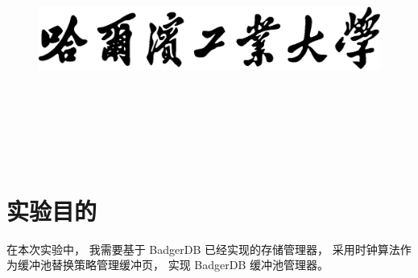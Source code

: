 \documentclass[12pt,onecolumn]{report}
\newcommand{\hei}{\CJKfamily{hei}}      %
\theoremstyle{plain}
\numberwithin{figure}{chapter}
\numberwithin{table}{chapter}
\numberwithin{lstlisting}{chapter}
\begin{document}
\begin{titlepage}
  \vspace{5\baselineskip}

  \begin{figure}[H]
    \centering
    \includegraphics[width=0.6\linewidth]{figures/school.eps}
  \end{figure}

  \centering\hei{}

  \xiaosan\vspace{\baselineskip}


  \erhao\vspace{2\baselineskip}


  \sanhao\vspace{3\baselineskip}

  ~~\underline{} \\ [24pt]
  ~~\underline{} \\ [24pt]
  ~~\underline{} \\ [24pt]
  ~~\underline{} \\ [24pt]
  ~~\underline{} \\ [24pt]
\end{titlepage}

\clearpage
\tableofcontents
\clearpage

\makeatletter
\patchcmd{\chapter}{\if@openright\cleardoublepage\else\clearpage\fi}{}{}{}
\makeatother

\chapter{实验目的}
在本次实验中，
我需要基于 BadgerDB 已经实现的存储管理器，
采用时钟算法作为缓冲池替换策略管理缓冲页，
实现 BadgerDB 缓冲池管理器。
\end{document}
